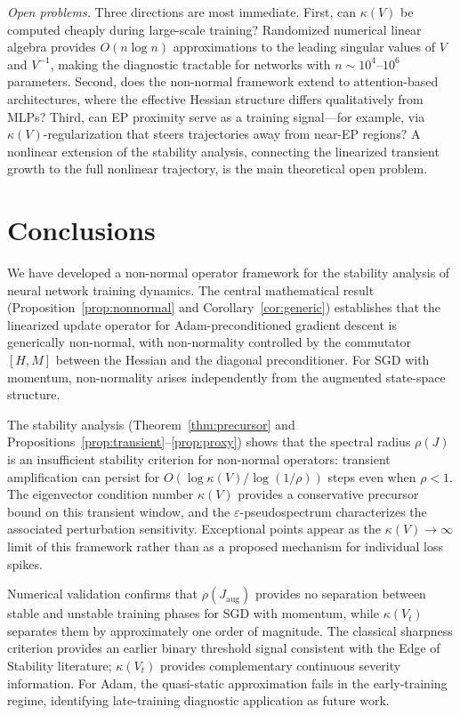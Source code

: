 \documentclass[aps,prresearch,twocolumn,superscriptaddress,longbibliography]{revtex4-2}
\begin{document}
\emph{Open problems.}
Three directions are most immediate.
First, can $\kappa(V)$ be computed cheaply during large-scale training?
Randomized numerical linear algebra provides $O(n\log n)$ approximations
to the leading singular values of $V$ and $V^{-1}$, making the
diagnostic tractable for networks with $n\sim 10^4$--$10^6$ parameters.
Second, does the non-normal framework extend to attention-based
architectures, where the effective Hessian structure differs
qualitatively from MLPs?
Third, can EP proximity serve as a training signal---for example, via
$\kappa(V)$-regularization that steers trajectories away from near-EP
regions?
A nonlinear extension of the stability analysis, connecting the
linearized transient growth to the full nonlinear trajectory, is the
main theoretical open problem.

\section{Conclusions}
\label{sec:conclusions}

We have developed a non-normal operator framework for the stability
analysis of neural network training dynamics.
The central mathematical result (Proposition~\ref{prop:nonnormal} and
Corollary~\ref{cor:generic}) establishes that the linearized update
operator for Adam-preconditioned gradient descent is generically
non-normal, with non-normality controlled by the commutator $[H,M]$
between the Hessian and the diagonal preconditioner.
For SGD with momentum, non-normality arises independently from the
augmented state-space structure.

The stability analysis (Theorem~\ref{thm:precursor} and
Propositions~\ref{prop:transient}--\ref{prop:proxy}) shows that the
spectral radius $\rho(J)$ is an insufficient stability criterion for
non-normal operators: transient amplification can persist for
$O(\log\kappa(V)/\log(1/\rho))$ steps even when $\rho < 1$.
The eigenvector condition number $\kappa(V)$ provides a conservative
precursor bound on this transient window, and the $\varepsilon$-pseudospectrum
characterizes the associated perturbation sensitivity.
Exceptional points appear as the $\kappa(V)\to\infty$ limit of this
framework rather than as a proposed mechanism for individual loss spikes.

Numerical validation confirms that $\rho(J_\mathrm{aug})$ provides no
separation between stable and unstable training phases for SGD with
momentum, while $\kappa(V_t)$ separates them by approximately one order
of magnitude.
The classical sharpness criterion provides an earlier binary threshold
signal consistent with the Edge of Stability literature;
$\kappa(V_t)$ provides complementary continuous severity information.
For Adam, the quasi-static approximation fails in the early-training
regime, identifying late-training diagnostic application as future work.
\end{document}
